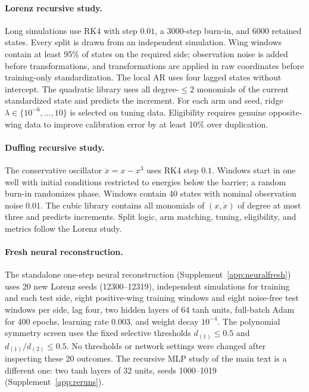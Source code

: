 \paragraph{Lorenz recursive study.} Long simulations use RK4 with step $0.01$, a 3000-step burn-in, and 6000 retained states. Every split is drawn from an independent simulation. Wing windows contain at least 95\% of states on the required side; observation noise is added before transformations, and transformations are applied in raw coordinates before training-only standardization. The local AR uses four lagged states without intercept. The quadratic library uses all degree-$\le2$ monomials of the current standardized state and predicts the increment. For each arm and seed, ridge $\lambda\in\{10^{-6},\ldots,10\}$ is selected on tuning data. Eligibility requires genuine opposite-wing data to improve calibration error by at least 10\% over duplication.

\paragraph{Duffing recursive study.} The conservative oscillator $\ddot x=x-x^3$ uses RK4 step $0.1$. Windows start in one well with initial conditions restricted to energies below the barrier; a random burn-in randomizes phase. Windows contain 40 states with nominal observation noise $0.01$. The cubic library contains all monomials of $(x,\dot x)$ of degree at most three and predicts increments. Split logic, arm matching, tuning, eligibility, and metrics follow the Lorenz study.

\paragraph{Fresh neural reconstruction.} The standalone one-step neural reconstruction (Supplement~\ref{app:neuralfresh}) uses 20 new Lorenz seeds (12300--12319), independent simulations for training and each test side, eight positive-wing training windows and eight noise-free test windows per side, lag four, two hidden layers of 64 tanh units, full-batch Adam for 400 epochs, learning rate $0.003$, and weight decay $10^{-4}$. The polynomial symmetry screen uses the fixed selective thresholds $d_{(1)}\le0.5$ and $d_{(1)}/d_{(2)}\le0.5$. No thresholds or network settings were changed after inspecting these 20 outcomes. The recursive MLP study of the main text is a different one: two tanh layers of 32 units, seeds 1000--1019 (Supplement~\ref{app:reruns}).

